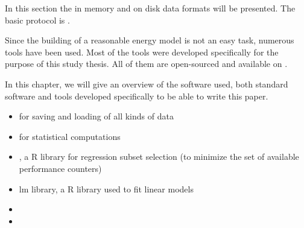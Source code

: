 
\label{sec:data-formats}

In this section the in memory and on disk data formats will be presented. The
basic protocol is \JWTprotobuf.

\label{sec:datapoint-files}


\label{sec:counter-files}


\label{sec:tools}

Since the building of a reasonable energy model is not an easy task, numerous
tools have been used. Most of the tools were developed specifically for the
purpose of this study thesis. All of them are open-sourced and available on
.

In this chapter, we will give an overview of the software used, both standard
software and tools developed specifically to be able to write this paper.


\label{sec:standard-software}

\begin{itemize}

\item \JWTprotobuf for saving and loading of all kinds of data

\item {} for statistical computations

\item {}
      , a R library for regression subset selection (to minimize the set of
      available performance counters)

\item {}
      {lm library}, a R library used to fit linear models

\item {}

\item {}

\end{itemize}


